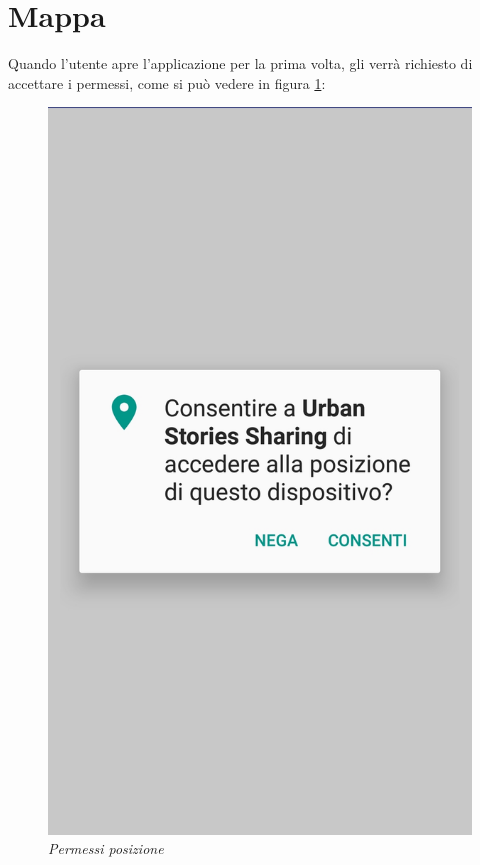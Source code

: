 \section{Mappa}
\label{mappa}
Quando l'utente apre l'applicazione per la prima volta, gli verrà richiesto di accettare i permessi, come si può vedere in figura \ref{fig:permessiPosizione}:
\begin{figure}[!h]
    \centering
	\includegraphics[scale=0.115]{Tesi/images/PermessiPosizione}
	\caption{\textit{Permessi posizione}}
	\label{fig:permessiPosizione}
\end{figure}\pagebreak
